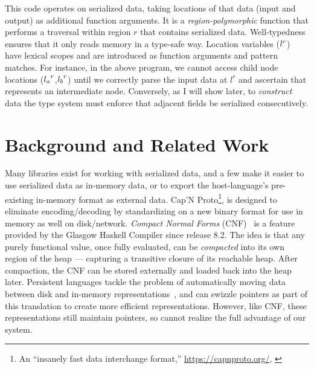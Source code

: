 This code operates on serialized data, taking locations of that data (input and
output) as additional function arguments.  It is a {\em region-polymorphic}
function that performs a traversal within region $r$ that contains serialized
data.  Well-typedness ensures that it only reads memory in a type-safe way.
%
Location variables (${l}^{r}$) have lexical scopes and are introduced as
function arguments and pattern matches.
%
For instance, in the above program, we cannot
access child node locations (${l_a}^{r}$,${l_b}^{r}$) until we correctly parse the input
data at $l^r$ and ascertain that represents an intermediate node.
%
Conversely, as I will show later, to \emph{construct} data the type system must
enforce that adjacent fields be serialized consecutively.


\section{Background and Related Work}\label{sec:bg}

Many libraries exist for working with serialized data, and a few
make it easier to use serialized data as in-memory data, or to export the
host-language's pre-existing in-memory format as external data.
Cap'N Proto\footnote{An ``insanely fast data interchange format,''
  \url{https://capnproto.org/}, \cite{capnproto}},
is designed to eliminate encoding/decoding by
standardizing on a new binary format for use in memory as well on disk/network.
%
%
{\em Compact Normal Forms} (CNF)~\cite{cnf-icfp15} is
a feature provided by the Glasgow Haskell Compiler since release 8.2.
%
%
The idea is that any purely functional value, once fully evaluated, can be {\em compacted}
into its own region of the heap
--- capturing a transitive closure of its reachable heap.
After compaction, the CNF can be stored externally and loaded
back into the heap later.
%
{Persistent languages tackle the problem of automatically moving data between disk
and in-memory representations~\cite{persistent-java,persistent-object-systems,persistent-objects-thor}, and can swizzle pointers as part of this
translation to create more efficient representations. However, like CNF, these
representations still maintain pointers, so cannot realize the full advantage of
our system.}

